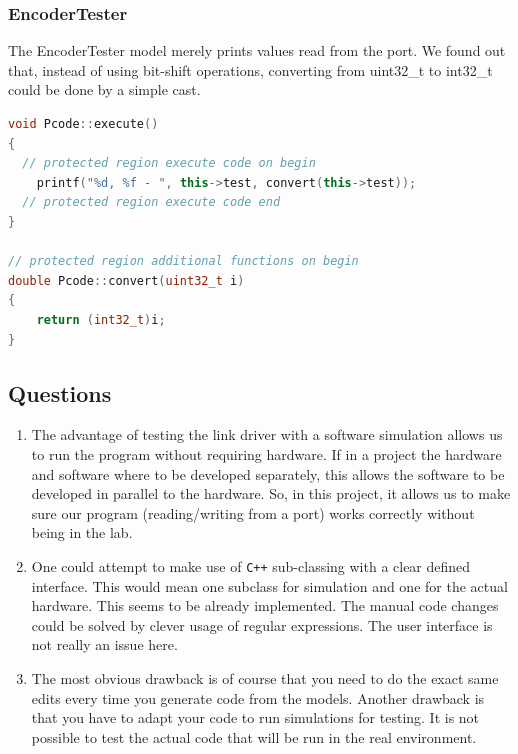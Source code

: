 \documentclass[a4paper,twoside,11pt]{article}
\newcommand{\cpp}{{\tt C++} }
\begin{document}
\subsubsection{EncoderTester}
The EncoderTester model merely prints values read from the port. We found out 
that, instead of using bit-shift operations, converting from uint32\_t to int32\_t could be done by a simple cast. 
\begin{lstlisting}[caption=Relevant EncoderTester functions, label=code:enc, language=C++]
void Pcode::execute()
{
  // protected region execute code on begin
	printf("%d, %f - ", this->test, convert(this->test));
  // protected region execute code end
}

// protected region additional functions on begin
double Pcode::convert(uint32_t i)
{
	return (int32_t)i;
}
\end{lstlisting}

\subsection{Questions}
\begin{enumerate}
	\item The advantage of testing the link driver with a software simulation 
		allows us to run the program without requiring hardware.
		If in a project the hardware and software where to be developed 
		separately, this allows the software to be developed in parallel to the hardware.
		So, in this project, it allows us to make sure our program (reading/writing from a port) works correctly without being in the lab.
	\item One could attempt to make use of \cpp sub-classing with a clear defined interface.
		This would mean one subclass for simulation and one for the actual hardware.
		This seems to be already implemented. The manual code changes could be solved by clever usage of regular expressions. The user interface is not really an issue here.
	\item The most obvious drawback is of course that you need to do the exact same edits every time you generate code from the models. Another drawback is that you have to adapt your code to run simulations for testing. It is not possible to test the actual code that will be run in the real environment.
\end{enumerate}
\end{document}
